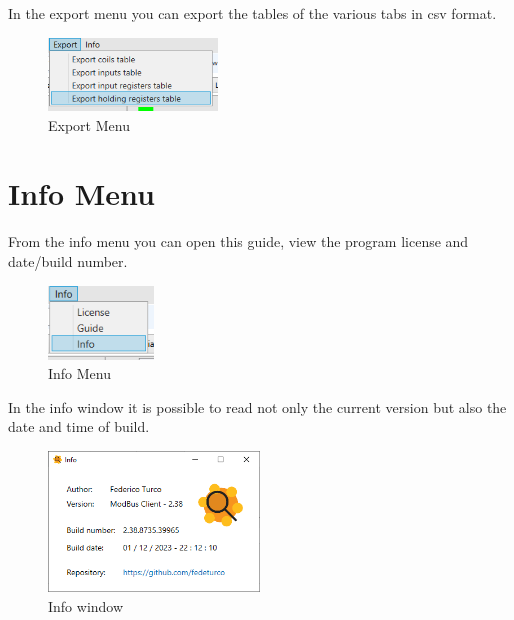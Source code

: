 In the export menu you can export the tables of the various tabs in csv format.

\begin{figure}[H]
\centering
\includegraphics[width=0.4\textwidth]{../Img/Menu_Export.PNG}
\caption{Export Menu}
\end{figure}

\section{Info Menu}

From the info menu you can open this guide, view the program license and
date/build number.

\begin{figure}[H]
\centering
\includegraphics[width=0.25\textwidth]{../Img/Menu_Info.PNG}
\caption{Info Menu}
\end{figure}

In the info window it is possible to read not only the current version but also the date and time of build.

\begin{figure}[H]
\centering
\includegraphics[width=0.5\textwidth]{../Img/Finestra_Info.PNG}
\caption{Info window}
\end{figure}